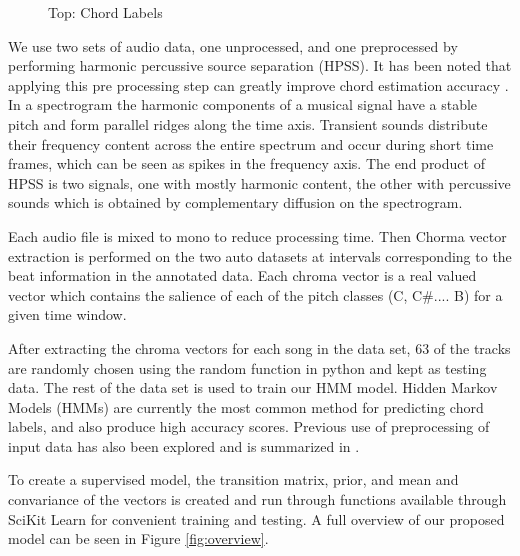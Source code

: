 \documentclass{article}
\begin{document}
\begin{figure}
\begin{center}
\caption{Top: Chord Labels}
\label{fig:chordlabs}
\end{center}
\end{figure}

We use two sets of audio data, one unprocessed, and one preprocessed by
performing harmonic percussive source separation (HPSS). It has been noted that 
applying this pre processing step can greatly improve chord estimation accuracy \cite{Reed:09}. 
In a spectrogram the harmonic components of a musical signal have 
a stable pitch and form parallel ridges along the time axis. Transient sounds distribute 
their frequency content across the entire spectrum and occur during short time frames, 
which can be seen as spikes in the frequency axis. The end product of HPSS is two signals, 
one with mostly harmonic content, the other with percussive sounds which is obtained by 
complementary diffusion on the spectrogram.

Each audio file is mixed to mono to reduce processing time. Then Chorma vector extraction is 
performed on the two auto datasets at intervals corresponding to the beat information in the 
annotated data. Each chroma vector is a real valued vector which contains the salience of each 
of the pitch classes (C, C\#.... B) for a given time window.

After extracting the chroma vectors for each song in the data set, 63 of the tracks are randomly
chosen using the random function in python and kept as testing data. The rest of the data set
is used to train our HMM model. Hidden Markov Models (HMMs) are currently the most common method for 
predicting chord labels, and also produce high accuracy scores. Previous use of
preprocessing of input data has also been explored and is summarized in \cite{McVicar:00}.

To create a supervised model, the transition matrix, prior, and mean and convariance of the 
vectors is created and run through functions available through
SciKit Learn for convenient training and testing. A full overview of our
proposed model can be seen in Figure \ref{fig:overview}.
\end{document}
